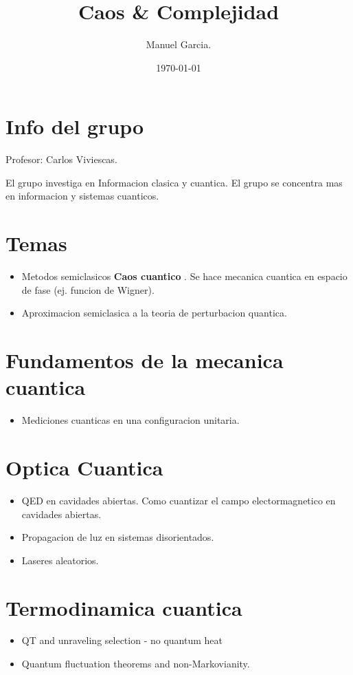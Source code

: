 \documentclass{article}
\title{Caos \& Complejidad }
\author{Manuel Garcia.}
\date{\today}
\begin{document}
\maketitle

\section{Info del grupo }
Profesor: Carlos Viviescas. 

El grupo investiga en Informacion clasica y cuantica. El grupo se concentra mas en informacion y sistemas cuanticos. 

\section{Temas }
\begin{itemize}
  \item Metodos semiclasicos 
    \textbf{Caos cuantico }. Se hace mecanica cuantica en espacio de fase (ej. funcion de Wigner). 
  \item Aproximacion semiclasica a la teoria de perturbacion quantica. 
\end{itemize}


\section{Fundamentos de la mecanica cuantica }
\begin{itemize}
  \item Mediciones cuanticas en una configuracion unitaria. 
\end{itemize}

\section{Optica Cuantica }
\begin{itemize}
  \item QED en cavidades abiertas. Como cuantizar el campo electormagnetico en cavidades abiertas. 
  \item Propagacion de luz en sistemas disorientados. 
  \item Laseres aleatorios. 
\end{itemize}

\section{Termodinamica cuantica }
\begin{itemize}
  \item QT and unraveling selection - no quantum heat 
  \item Quantum fluctuation theorems and non-Markovianity.
\end{itemize}
\end{document}
